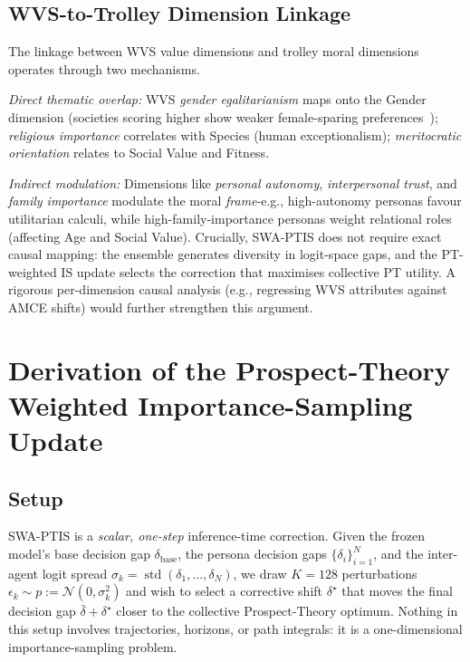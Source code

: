 \documentclass{article}
\begin{document}
\subsection{WVS-to-Trolley Dimension Linkage}
\label{app:wvs_linkage}

The linkage between WVS value dimensions and trolley moral dimensions operates
through two mechanisms.

\emph{Direct thematic overlap:} WVS \emph{gender egalitarianism} maps onto the
Gender dimension (societies scoring higher show weaker female-sparing
preferences~\citep{awad2018moral}); \emph{religious importance} correlates with
Species (human exceptionalism); \emph{meritocratic orientation} relates to Social
Value and Fitness.

\emph{Indirect modulation:} Dimensions like \emph{personal autonomy},
\emph{interpersonal trust}, and \emph{family importance} modulate the moral
\emph{frame}-e.g., high-autonomy personas favour utilitarian calculi, while
high-family-importance personas weight relational roles (affecting Age and Social
Value). Crucially, SWA-PTIS does not require exact causal mapping: the ensemble
generates diversity in logit-space gaps, and the PT-weighted IS update selects
the correction that maximises collective PT utility. A rigorous per-dimension causal analysis (e.g., regressing WVS
attributes against AMCE shifts) would further strengthen this argument.

\section{Derivation of the Prospect-Theory Weighted Importance-Sampling Update}
\label{app:is_theory}

\subsection{Setup}
SWA-PTIS is a \emph{scalar, one-step} inference-time correction. Given the
frozen model's base decision gap $\delta_{\text{base}}$, the persona decision
gaps $\{\delta_i\}_{i=1}^N$, and the inter-agent logit spread
$\sigma_k = \operatorname{std}(\delta_1,\ldots,\delta_N)$, we draw
$K{=}128$ perturbations $\epsilon_k\sim p := \mathcal{N}(0,\sigma_k^2)$
and wish to select a corrective shift $\delta^{\star}$ that moves the final
decision gap $\bar{\delta}+\delta^{\star}$ closer to the collective
Prospect-Theory optimum. Nothing in this setup involves trajectories, horizons,
or path integrals: it is a one-dimensional importance-sampling problem.
\end{document}
